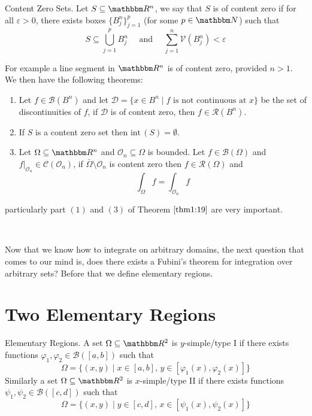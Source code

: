 \documentclass[Analysis-3.tex]{subfiles}
\begin{document}
\begin{Def}{Content Zero Sets.}
    Let $S \subseteq \R^n$, we say that $S$ is of content zero if for all $\varepsilon > 0$, there exists boxes $\{ B_j^n \}_{j=1}^p$ (for some $p \in \N$) such that 
    \[
        S \subseteq \bigcup_{j=1}^p B_j^n \quad \mbox{ and } \quad \sum_{j=1}^n \mathcal{V}(B^n_j) < \varepsilon     
    \]
\end{Def}

For example a line segment in $\R^n$ is of content zero, provided $n > 1$. We then have the following theorems: 

\begin{Thm}{}{}\label{thm1:19}
    \begin{enumerate}
        \item Let $f \in \mathscr{B}(B^n)$ and let $\mathcal{D} = \{ x \in B^n \mid f \mbox{ is not continuous at } x \}$ be the set of discontinuities of $f$, if $\mathcal{D}$ is of content zero, then $f \in \mathscr{R}(B^n)$.
        
        \item If $S$ is a content zero set then $\mathrm{int}\,(S) = \emptyset$. 
        
        \item Let $\Omega \subseteq \R^n$ and $\mathcal{O}_n \subseteq \Omega$ is bounded. Let $f \in \mathscr{B}(\Omega)$ and $f\vert_{\mathcal{O}_n} \in \mathscr{C}(\mathcal{O}_n)$, if $\bar{\Omega}\setminus \mathcal{O}_n$ is content zero then $f \in \mathscr{R}(\Omega)$ and 
        \[
            \int_{\Omega} f = \int_{\mathcal{O}_n} f     
        \]
    \end{enumerate}
\end{Thm}
particularly part $(1)$ and $(3)$ of Theorem $\ref{thm1:19}$ are very important.

\ 

Now that we know how to integrate on arbitrary domains, the next question that comes to our mind is, does there exists a Fubini's theorem for integration over arbitrary sets? Before that we define elementary regions. 

\section{Two Elementary Regions}

\begin{Def}{Elementary Regions.}
    A set $\Omega \subseteq \R^2$ is $y$-simple/type I if there exists functions $\varphi_1, \varphi_2 \in \mathscr{B}([a,b])$ such that 
    \[
        \Omega = \{ (x,y) \mid x \in [a,b], \, y \in [\varphi_1(x), \varphi_2(x)] \}    
    \] 
    Similarly a set $\Omega \subseteq \R^2$ is $x$-simple/type II if there exists functions $\psi_1, \psi_2 \in \mathscr{B}([c,d])$ such that 
    \[
        \Omega = \{ (x,y) \mid y \in [c,d], \, x \in [ \psi_1(x), \psi_2(x) ] \}    
    \]
\end{Def}
\end{document}
